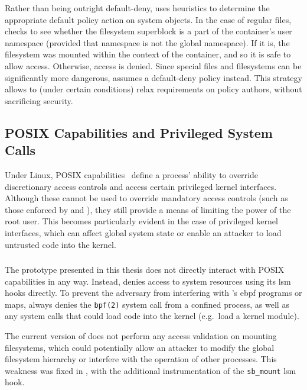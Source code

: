 Rather than being outright default-deny, \bpfcontain{} uses heuristics to determine the
appropriate default policy action on system objects. In the case of regular files,
\bpfcontain{} checks to see whether the filesystem superblock is a part of the container's
user namespace (provided that namespace is not the global namespace). If it is, the
filesystem was mounted within the context of the container, and so it is safe to allow
access. Otherwise, access is denied. Since special files and filesystems can be
significantly more dangerous, \bpfcontain{} assumes a default-deny policy instead. This
strategy allows \bpfcontain{} to (under certain conditions) relax requirements on policy
authors, without sacrificing security.

\subsection{POSIX Capabilities and Privileged System Calls}

Under Linux, POSIX capabilities~\cite{posix_capabilities} define a process' ability to
override discretionary access controls and access certain privileged kernel interfaces.
Although these cannot be used to override mandatory access controls (such as those
enforced by \bpfbox{} and \bpfcontain{}), they still provide a means of limiting the power
of the root user. This becomes particularly evident in the case of privileged kernel
interfaces, which can affect global system state or enable an attacker to load untrusted
code into the kernel.

\subsubsection{\bpfbox{}}

The \bpfbox{} prototype presented in this thesis does not directly interact with POSIX
capabilities in any way. Instead, \bpfbox{} denies access to system resources using its
\gls{lsm} hooks directly. To prevent the adversary from interfering with \bpfbox{}'s
\gls{ebpf} programs or maps, \bpfbox{} always denies the \texttt{bpf(2)} system call from
a confined process, as well as any system calls that could load code into the kernel
(e.g.~load a kernel module).

The current version of \bpfbox{} does not perform any access validation on mounting
filesystems, which could potentially allow an attacker to modify the global filesystem
hierarchy or interfere with the operation of other processes. This weakness was fixed in
\bpfcontain{}, with the additional instrumentation of the \texttt{sb\_mount} \gls{lsm}
hook.

